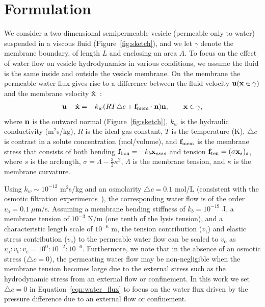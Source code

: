 \documentclass[prb,preprint,showpacs,preprintnumbers,amsmath,amssymb,longbibliography]{revtex4-1}
\begin{document}
\section{Formulation\label{sec:formulation}}
We consider a two-dimensional semipermeable vesicle (permeable only to
water) suspended in a viscous fluid (Figure~\ref{fig:sketch}), and we
let $\gamma$ denote the membrane boundary, of length $L$ and enclosing an area $A$.
%
%
To focus on the effect of water flow on vesicle
hydrodynamics in various conditions, we assume the fluid is the same
inside and outside the vesicle membrane. On the membrane the permeable
water flux gives rise to a difference between the fluid velocity
${\mathbf{u}}({\mathbf{x}}\in \gamma)$ and the membrane velocity
$\dot{\mathbf{x}}$~\cite{yao-mor2017}:
\begin{align}
\label{eqn:water_flux}
  \mathbf{u} - \dot{\mathbf{x}} = - k_w (R T \triangle c + \mathbf{f}_\mathrm{mem} \cdot \mathbf{n}) \mathbf{n}, \qquad
  \mathbf{x} \in \gamma,
\end{align}
where $\mathbf{n}$ is the outward normal (Figure~\ref{fig:sketch}), $k_w$ is
the hydraulic conductivity (m$^2$s/kg), $R$ is the ideal gas constant,
$T$ is the temperature (K), $\triangle c$ is contrast in a solute
concentration (mol/volume), and $\mathbf{f}_\mathrm{mem}$ is the membrane
stress that consists of both bending $ \mathbf{f}_\mathrm{ben}= -k_b
\mathbf{x}_{ssss}$ and tension $\mathbf{f}_\mathrm{ten}=(\sigma \mathbf{x}_s)_s$, where $s$
is the arclength, $\sigma = \Lambda - \frac{3}{2}\kappa^2$, $\Lambda$ is the
membrane tension, and $\kappa$ is the membrane curvature. 

Using $k_w\sim 10^{-12}$ m$^2$s/kg 
and an osmolarity $\triangle c = 0.1$ mol/L (consistent with the osmotic
filtration experiments~\cite{OlbrichRawiczNeedhamEtAl2000_BJ}), the
corresponding water flow is of the order $v_\mathrm{o}=0.1 \; \mu$m/s.
Assuming a membrane bending stiffness of $k_b = 10^{-19}$ J, a membrane
tension of $10^{-3}$ N/m (one tenth of the lysis tension), and a
characteristic length scale of $10^{-6}$ m, the tension contribution
($v_\mathrm{t}$) and elastic stress contribution ($v_\mathrm{e}$) to the
permeable water flow can be scaled to $v_\mathrm{o}$ as
$v_\mathrm{o}:v_\mathrm{t}:v_\mathrm{e}=10^{0}:10^{-2}:10^{-6}$.
Furthermore, we note that in the absence of an osmotic stress
($\triangle c = 0$), the permeating water flow may be non-negligible
when the membrane tension becomes large due to the external stress such
as the hydrodynamic stress from an external flow or confinement. 
In this work we set $\triangle c =0$ in Equation~\eqref{eqn:water_flux}  to
focus on the water flux driven by the pressure difference due to an external flow or confinement.
\end{document}
